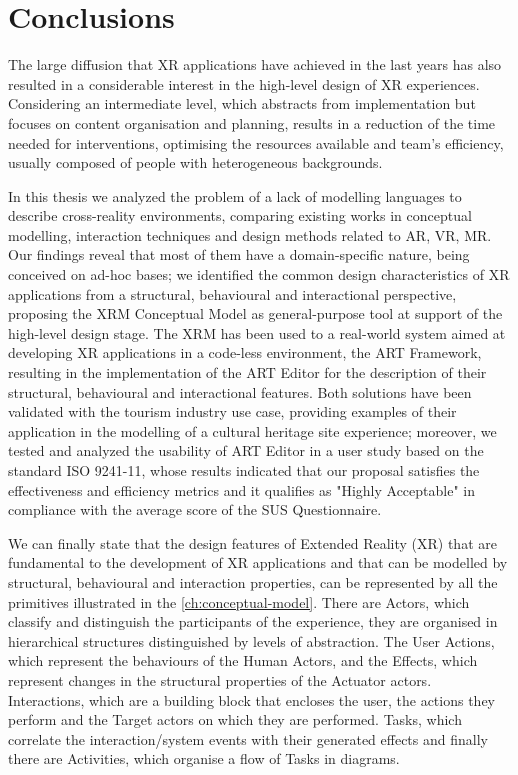 \chapter{Conclusions}
\label{ch:conclusions}
The large diffusion that XR applications have achieved in the last years has also resulted in a considerable interest in the high-level design of XR experiences. Considering an intermediate level, which abstracts from implementation but focuses on content organisation and planning, results in a reduction of the time needed for interventions, optimising the resources available and team's efficiency, usually composed of people with heterogeneous backgrounds.

In this thesis we analyzed the problem of a lack of modelling languages to describe cross-reality environments, comparing existing works in conceptual modelling, interaction techniques and design methods related to \gls{AR}, \gls{VR}, \gls{MR}. 
Our findings reveal that most of them have a domain-specific nature, being conceived on ad-hoc bases; we identified the common design characteristics of \gls{XR} applications from a structural, behavioural and interactional perspective, proposing the XRM Conceptual Model as general-purpose tool at support of the high-level design stage.
The XRM has been used to a real-world system aimed at developing XR applications in a code-less environment, the ART Framework, resulting in the implementation of the ART Editor for the description of their structural, behavioural and interactional features.
Both solutions have been validated with the tourism industry use case, providing examples of their application in the modelling of a cultural heritage site experience; moreover, we tested and analyzed the usability of ART Editor in a user study based on the standard ISO 9241-11, whose results indicated that our proposal satisfies the effectiveness and efficiency metrics and it qualifies as "Highly Acceptable" in compliance with the average score of the \gls{SUS} Questionnaire.

We can finally state that the design features of Extended Reality (XR) that are fundamental to the development of XR applications and that can be modelled by structural, behavioural and interaction properties, can be represented by all the primitives illustrated in the \autoref{ch:conceptual-model}. There are Actors, which classify and distinguish the participants of the experience, they are organised in hierarchical structures distinguished by levels of abstraction. The User Actions, which represent the behaviours of the Human Actors, and the Effects, which represent changes in the structural properties of the Actuator actors. Interactions, which are a building block that encloses the user, the actions they perform and the Target actors on which they are performed. Tasks, which correlate the interaction/system events with their generated effects and finally there are Activities, which organise a flow of Tasks in diagrams.

